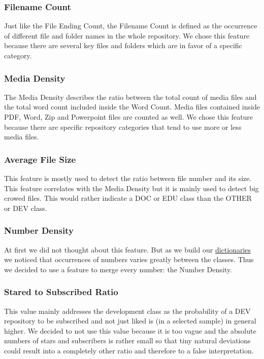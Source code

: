 \documentclass[paper=A4,pagesize=auto,12pt,headinclude=true,footinclude=true,BCOR=0mm,DIV=calc]{scrartcl}
\begin{document}
	\subsubsection{Filename Count}
	
	Just like the File Ending Count, the Filename Count is defined as the occurrence of different file and folder names in the whole repository.
	We chose this feature because there are several key files and folders which are in favor of a specific category.        
	
	\subsubsection{Media Density}
	
	The Media Density describes the ratio between the total count of media files and the total word count included inside the Word Count. Media files contained inside PDF, Word, Zip and Powerpoint files are counted as well. We chose this feature because there are specific repository categories that tend to use more or less media files.
	
	\subsubsection{Average File Size}
	This feature is mostly used to detect the ratio between file number and its size. This feature correlates with the Media Density but it is mainly used to detect big crowed files. This would rather indicate a DOC or EDU class than the OTHER or DEV class.
	
	\subsubsection{Number Density}
	At first we did not thought about this feature. But as we build our \hyperref[sec: dictionary]{dictionaries} we noticed that occurrences of numbers varies greatly between the classes. Thus we decided to use a feature to merge every number: the Number Density.
	
	\subsubsection{Stared to Subscribed Ratio}
	This value mainly addresses the development class as the probability of a DEV repository to be subscribed and not just liked is (in a selected sample) in general higher. We decided to not use this value because it is too vague and the absolute numbers of stars and subscribers is rather small so that tiny natural deviations could result into a completely other ratio and therefore to a false interpretation.
	
\end{document}
